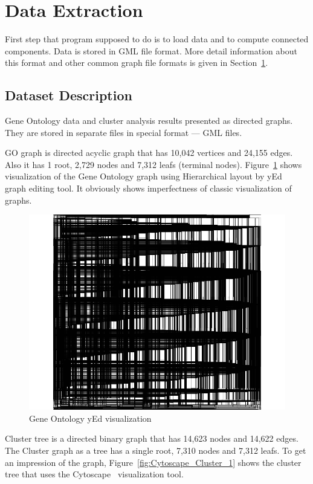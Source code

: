 \newpage
\section{Data Extraction}
\label{sec:algorithm}
First step that program supposed to do is to load data and to compute connected components. Data is stored in GML file format. More detail information about this format and other common graph file formats is given in Section~\ref{sec:algorithm}.

\subsection{Dataset Description}
\label{sec:dataset_description}
Gene Ontology data and cluster analysis results presented as directed graphs. They are stored in separate files in special format --- GML files.


GO graph is directed acyclic graph that has 10,042 vertices and  24,155 edges. Also it has 1 root, 2,729 nodes and 7,312 leafs (terminal nodes).
Figure~\ref{fig:yed_GO_vis} shows visualization of the Gene Ontology graph using Hierarchical layout by yEd~\cite{yed} graph editing tool. It obviously shows imperfectness of classic visualization of graphs.


\begin{figure}[h!]
\centering
\includegraphics[scale=0.3]{pictures/yEd_GO.png}
\caption{Gene Ontology yEd visualization}
\label{fig:yed_GO_vis}
\end{figure}


Cluster tree is a directed binary graph that has 14,623 nodes and 14,622 edges. The Cluster graph as a tree has a single root, 7,310 nodes and 7,312 leafs.
To get an impression of the graph, Figure~\ref{fig:Cytoscape_Cluster_1} shows the cluster tree that uses the Cytoscape~\cite{Cytoscape} visualization tool.

